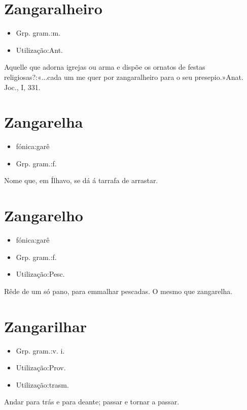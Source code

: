 \section{Zangaralheiro}
\begin{itemize}
\item {Grp. gram.:m.}
\end{itemize}
\begin{itemize}
\item {Utilização:Ant.}
\end{itemize}
Aquelle que adorna igrejas ou arma e dispõe os ornatos de festas religiosas?:«\textunderscore ...cada um me quer por zangaralheiro para o seu presepio.\textunderscore »\textunderscore Anat. Joc.\textunderscore , I, 331.
\section{Zangarelha}
\begin{itemize}
\item {fónica:garê}
\end{itemize}
\begin{itemize}
\item {Grp. gram.:f.}
\end{itemize}
Nome que, em Ílhavo, se dá á tarrafa de arrastar.
\section{Zangarelho}
\begin{itemize}
\item {fónica:garê}
\end{itemize}
\begin{itemize}
\item {Grp. gram.:f.}
\end{itemize}
\begin{itemize}
\item {Utilização:Pesc.}
\end{itemize}
Rêde de um só pano, para emmalhar pescadas.
O mesmo que \textunderscore zangarelha\textunderscore .
\section{Zangarilhar}
\begin{itemize}
\item {Grp. gram.:v. i.}
\end{itemize}
\begin{itemize}
\item {Utilização:Prov.}
\end{itemize}
\begin{itemize}
\item {Utilização:trasm.}
\end{itemize}
Andar para trás e para deante; passar e tornar a passar.
